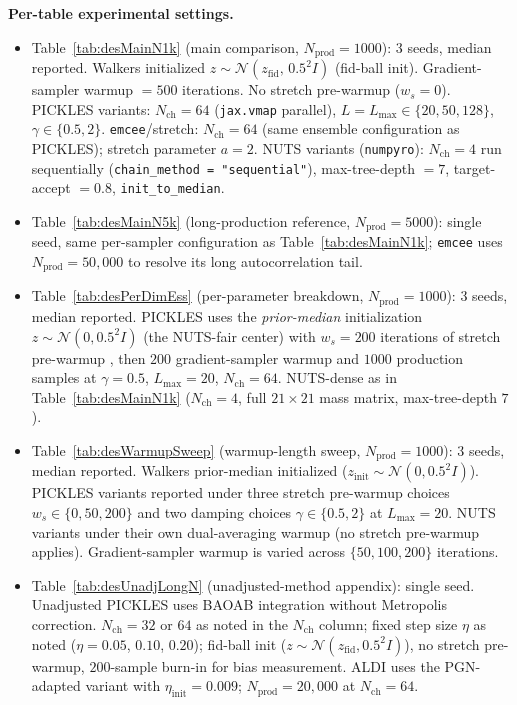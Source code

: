 \documentclass{article}
\begin{document}
\textbf{Per-table experimental settings.}
\begin{itemize}\setlength\itemsep{2pt}

\item Table~\ref{tab:desMainN1k} (main comparison, $N_{\text{prod}} = 1000$):
3 seeds, median reported.  Walkers initialized $z \sim \mathcal{N}(z_{\text{fid}},\, 0.5^2 I)$ (fid-ball init).  Gradient-sampler warmup $=500$ iterations.  No stretch
pre-warmup ($w_s = 0$).  PICKLES variants: $N_{\text{ch}} = 64$
(\texttt{jax.vmap} parallel), $L = L_{\max} \in \{20, 50, 128\}$,
$\gamma \in \{0.5, 2\}$.  \texttt{emcee}/stretch: $N_{\text{ch}} = 64$
(same ensemble configuration as PICKLES); stretch parameter $a = 2$.
NUTS variants (\texttt{numpyro}): $N_{\text{ch}} = 4$ run sequentially
(\texttt{chain\_method = "sequential"}), max-tree-depth $= 7$,
target-accept $= 0.8$, \texttt{init\_to\_median}.

\item Table~\ref{tab:desMainN5k} (long-production reference,
$N_{\text{prod}} = 5000$): single seed, same per-sampler configuration
as Table~\ref{tab:desMainN1k}; \texttt{emcee} uses $N_{\text{prod}} = 50{,}000$
to resolve its long autocorrelation tail.

\item Table~\ref{tab:desPerDimEss} (per-parameter breakdown,
$N_{\text{prod}} = 1000$): 3 seeds, median reported.  PICKLES uses the
\emph{prior-median} initialization $z \sim \mathcal{N}(0, 0.5^2 I)$ (the
NUTS-fair center) with $w_s = 200$ iterations of stretch pre-warmup
\cite{goodman2010ensemble}, then $200$ gradient-sampler warmup and
$1000$ production samples at $\gamma = 0.5$, $L_{\max} = 20$,
$N_{\text{ch}} = 64$.  NUTS-dense as in Table~\ref{tab:desMainN1k}
($N_{\text{ch}} = 4$, full $21\times 21$ mass matrix, max-tree-depth $7$).

\item Table~\ref{tab:desWarmupSweep} (warmup-length sweep,
$N_{\text{prod}} = 1000$): 3 seeds, median reported.  Walkers
prior-median initialized ($z_{\text{init}} \sim \mathcal{N}(0, 0.5^2 I)$).
PICKLES variants reported under three stretch pre-warmup choices
$w_s \in \{0, 50, 200\}$ and two damping choices $\gamma \in \{0.5, 2\}$
at $L_{\max} = 20$.  NUTS variants under their own dual-averaging
warmup (no stretch pre-warmup applies).  Gradient-sampler warmup is
varied across $\{50, 100, 200\}$ iterations.

\item Table~\ref{tab:desUnadjLongN} (unadjusted-method appendix):
single seed.  Unadjusted PICKLES uses BAOAB integration without
Metropolis correction.  $N_{\text{ch}} = 32$ or $64$ as noted in the
$N_{\text{ch}}$ column; fixed step size $\eta$ as noted ($\eta = 0.05$,
$0.10$, $0.20$); fid-ball init ($z \sim \mathcal{N}(z_{\text{fid}}, 0.5^2 I)$),
no stretch pre-warmup, $200$-sample burn-in for bias measurement.
ALDI uses the PGN-adapted variant with $\eta_{\text{init}} = 0.009$;
$N_{\text{prod}} = 20{,}000$ at $N_{\text{ch}} = 64$.

\end{itemize}
\end{document}
